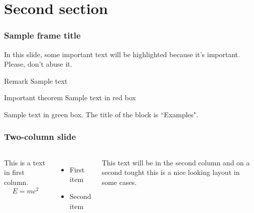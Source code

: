 \section{Second section}

\begin{frame}
\frametitle{Sample frame title}

In this slide, some important text will be
\alert{highlighted} because it's important.
Please, don't abuse it.

\begin{block}{Remark}
Sample text
\end{block}

\begin{alertblock}{Important theorem}
Sample text in red box
\end{alertblock}

\begin{examples}
Sample text in green box. The title of the block is ``Examples".
\end{examples}
\end{frame}


\begin{frame}
\frametitle{Two-column slide}

\begin{columns}

This is a text in first column.
$$E=mc^2$$
\begin{itemize}
\item First item
\item Second item
\end{itemize}

This text will be in the second column
and on a second tought this is a nice looking
layout in some cases.
\end{columns}
\end{frame}
